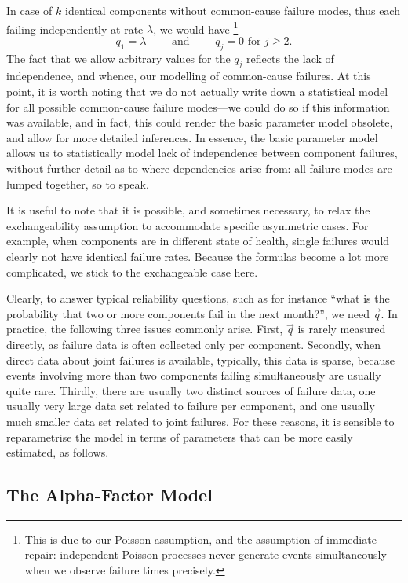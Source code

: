 In case of $k$ identical components without common-cause failure modes,
thus each failing independently at rate $\lambda$, we would have%
\footnote{This is due to our Poisson assumption, and the assumption of immediate repair:
independent Poisson processes never generate events simultaneously when we observe failure times precisely.}
\begin{equation*}
  q_1=\lambda\qquad \text{ and }\qquad q_j=0\text{ for }j\ge 2.
\end{equation*}
The fact that we allow arbitrary values for the $q_j$ reflects
the lack of independence, and whence, our modelling of common-cause failures.
At this point, it is worth noting that we do not actually write down a statistical model
for all possible common-cause failure modes---we could do so if this information was available,
and in fact, this could render the basic parameter model obsolete,
and allow for more detailed inferences.
In essence, the basic parameter model allows us to statistically model
lack of independence between component failures,
without further detail as to where dependencies arise from:
all failure modes are lumped together, so to speak.

It is useful to note that it is possible, and sometimes necessary,
to relax the exchangeability assumption
to accommodate specific asymmetric cases.
For example, when components are in different state of health,
single failures would clearly not have identical failure rates.
Because the formulas become a lot more complicated,
we stick to the exchangeable case here.

Clearly, to answer typical reliability questions, such as for instance
``what is the probability that two or more components fail in the next month?'',
we need $\vec{q}$.
In practice, the following three issues commonly arise.
First, $\vec{q}$ is rarely measured directly,
as failure data is often collected only per component.
Secondly, when direct data about joint failures is available,
typically, this data is sparse,
because events involving more than two components failing simultaneously are usually quite rare.
Thirdly, there are usually two distinct sources of failure data,
one usually very large data set related to failure per component,
and one usually much smaller data set related to joint failures.
For these reasons,
it is sensible to reparametrise the model in terms
of parameters that can be more easily estimated, as follows.


\subsection{The Alpha-Factor Model}
\label{sec:alpha-factor-model}

